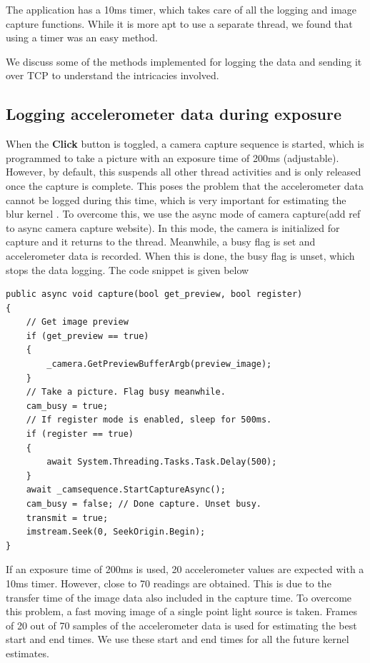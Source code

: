\documentclass[BTech]{iitmdiss}
\begin{document}
The application has a 10ms timer, which takes care of all the logging 
and image capture functions. While it is more apt to use a separate 
thread, we found that using a timer was an easy method. 

We discuss some of the methods implemented for logging the data and 
sending it over TCP to understand the intricacies involved.

\subsection{Logging accelerometer data during exposure}
\label{device:device_app:cam}
When the \textbf{Click} button is toggled, a camera capture sequence
is started, which is programmed to take a picture with an exposure time
of 200ms (adjustable). However, by default, this suspends all other 
thread activities and is only released once the capture is complete. 
This poses the problem that the accelerometer data cannot be logged 
during this time, which is very important for estimating the blur kernel
. To overcome this, we use the async mode of camera capture(add ref to
async camera capture website). In this mode, the camera is initialized
for capture and it returns to the thread. Meanwhile, a busy flag is set
and accelerometer data is recorded. When this is done, the busy flag is
unset, which stops the data logging. The code snippet is given below

\begin{singlespacing}
\begin{lstlisting}[style=sharpclisting]
public async void capture(bool get_preview, bool register)
{
    // Get image preview
    if (get_preview == true)
    {
        _camera.GetPreviewBufferArgb(preview_image);
    }
    // Take a picture. Flag busy meanwhile.
    cam_busy = true;
    // If register mode is enabled, sleep for 500ms.
    if (register == true)
    {
        await System.Threading.Tasks.Task.Delay(500);
    }
    await _camsequence.StartCaptureAsync();
    cam_busy = false; // Done capture. Unset busy.
    transmit = true;
    imstream.Seek(0, SeekOrigin.Begin);
}
\end{lstlisting}
\end{singlespacing}

If an exposure time of 200ms is used, 20 accelerometer values are 
expected with a 10ms timer. However, close to 70 readings are obtained.
This is due to the transfer time of the image data also included in the
capture time. To overcome this problem, a fast moving image of a single
point light source is taken. Frames of 20 out of 70 samples of the
accelerometer data is used for estimating the best start and end times.
We use these start and end times for all the future kernel estimates.
\end{document}
